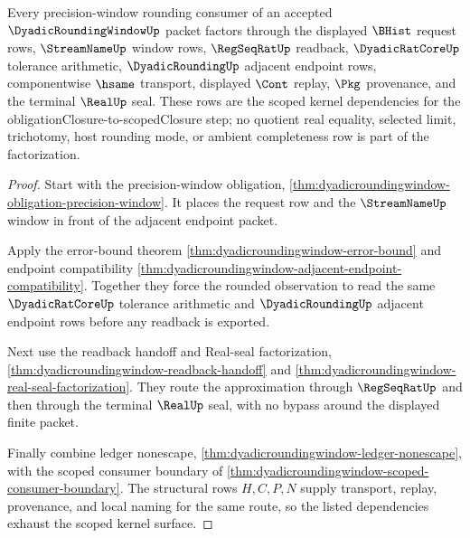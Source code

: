 \begin{theorem}
\label{thm:dyadic-rounding-window-scoped-kernel-dependencies}
Every precision-window rounding consumer of an accepted $\DyadicRoundingWindowUp$ packet factors through the displayed $\BHist$ request rows, $\StreamNameUp$ window rows, $\RegSeqRatUp$ readback, $\DyadicRatCoreUp$ tolerance arithmetic, $\DyadicRoundingUp$ adjacent endpoint rows, componentwise $\hsame$ transport, displayed $\Cont$ replay, $\Pkg$ provenance, and the terminal $\RealUp$ seal. These rows are the scoped kernel dependencies for the obligationClosure-to-scopedClosure step; no quotient real equality, selected limit, trichotomy, host rounding mode, or ambient completeness row is part of the factorization.
\end{theorem}
\begin{proof}
Start with the precision-window obligation, \autoref{thm:dyadicroundingwindow-obligation-precision-window}. It places the request row and the $\StreamNameUp$ window in front of the adjacent endpoint packet.

Apply the error-bound theorem \autoref{thm:dyadicroundingwindow-error-bound} and endpoint compatibility \autoref{thm:dyadicroundingwindow-adjacent-endpoint-compatibility}. Together they force the rounded observation to read the same $\DyadicRatCoreUp$ tolerance arithmetic and $\DyadicRoundingUp$ adjacent endpoint rows before any readback is exported.

Next use the readback handoff and Real-seal factorization, \autoref{thm:dyadicroundingwindow-readback-handoff} and \autoref{thm:dyadicroundingwindow-real-seal-factorization}. They route the approximation through $\RegSeqRatUp$ and then through the terminal $\RealUp$ seal, with no bypass around the displayed finite packet.

Finally combine ledger nonescape, \autoref{thm:dyadicroundingwindow-ledger-nonescape}, with the scoped consumer boundary of \autoref{thm:dyadicroundingwindow-scoped-consumer-boundary}. The structural rows $H,C,P,N$ supply transport, replay, provenance, and local naming for the same route, so the listed dependencies exhaust the scoped kernel surface.
\end{proof}

